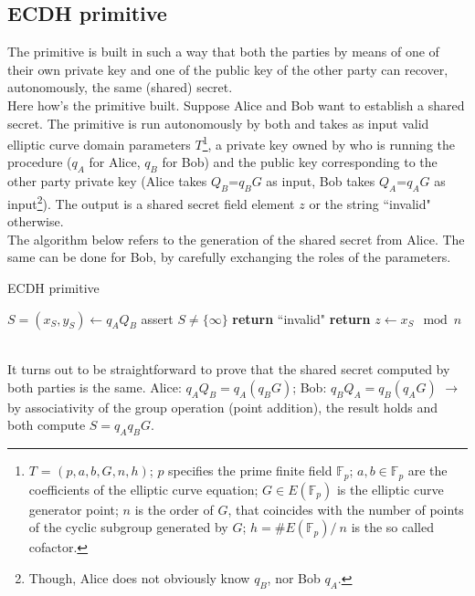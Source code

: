 \subsection{ECDH primitive}
The primitive is built in such a way that both the parties by means of one of their own private key and one of the public key of the other party can recover, autonomously, the same (shared) secret.\\
Here how's the primitive built. Suppose Alice and Bob want to establish a shared secret. The primitive is run autonomously by both and takes as input valid elliptic curve domain parameters $T$\footnote{$T$ = $(p, a, b, G, n, h)$; $p$ specifies the prime finite field $\mathbb{F}_p$; $a,b \in \mathbb{F}_p$ are the coefficients of the elliptic curve equation; $G \in E(\mathbb{F}_p)$ is the elliptic curve generator point; $n$ is the order of $G$, that coincides with the number of points of the cyclic subgroup generated by $G$; $h = \#E(\mathbb{F}_p)/\ n$ is the so called cofactor.}, a private key owned by who is running the procedure ($q_A$ for Alice, $q_B$ for Bob) and the public key corresponding to the other party private key (Alice takes $Q_B$=$q_BG$ as input, Bob takes $Q_A$=$q_AG$ as input\footnote{Though, Alice does not obviously know $q_B$, nor Bob $q_A$.}). The output is a shared secret field element $z$ or the string ``invalid" otherwise.\\
The algorithm below refers to the generation of the shared secret from Alice. The same can be done for Bob, by carefully exchanging the roles of the parameters.
\begin{algorithm}
	\caption{ECDH primitive}
	\label{alg:ECDH}
	\begin{algorithmic}[1]
		\State $S = (x_S,y_S) \gets q_AQ_B$
		\State assert $S \neq \{\infty\}$
		\State \textbf{return} ``invalid"
		\EndIf 
		\State \textbf{return} $z \gets x_S \mod{n}$ 
		\EndProcedure
	\end{algorithmic}
\end{algorithm}\\
It turns out to be straightforward to prove that the shared secret computed by both parties is the same. Alice: $q_AQ_B = q_A(q_BG)$; Bob: $q_BQ_A = q_B(q_AG)$ $\rightarrow$ by associativity of the group operation (point addition), the result holds and both compute $S=q_Aq_BG$.
